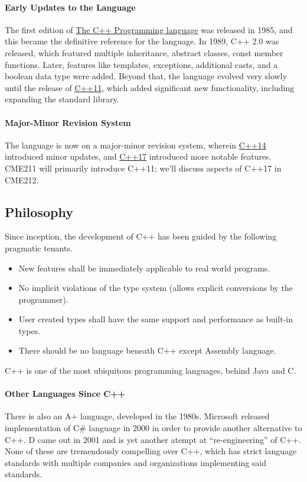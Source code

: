 \documentclass[12pt,letterpaper,twoside]{article}
\begin{document}
  \paragraph{Early Updates to the Language} The first edition of
  \href{https://en.wikipedia.org/wiki/The_C\%2B\%2B_Programming_Language}{The
    C++ Programming language} was released in 1985, and this became
  the definitive reference for the language. In 1989, C++
  2.0 was released, which featured multiple inheritance, abstract
  classes, const member functions. Later, features like templates,
  exceptions, additional casts, and a boolean data type were
  added. Beyond that, the language evolved very slowly until the
  release of
  \href{https://en.wikipedia.org/wiki/C\%2B\%2B11}{C++11},
  which added significant new functionality,
  including expanding the standard library.

  \paragraph{Major-Minor Revision System}
  The language is now on a
  major-minor revision system, wherein
  \href{https://en.wikipedia.org/wiki/C\%2B\%2B14}{C++14}
  introduced minor updates,
  and
  \href{https://en.wikipedia.org/wiki/C\%2B\%2B17}{C++17} introduced
  more notable features.
  CME211 will primarily introduce C++11; we'll
  discuss aspects of C++17 in CME212.

  \subsection{Philosophy} Since inception, the development of C++ has
  been guided by the following pragmatic tenants.

  \begin{itemize}
  \item New features shall be immediately applicable to real world programs.
  \item No implicit violations of the type system ({\footnotesize allows explicit
    conversions by the programmer}).
  \item User created types shall have the same support and performance
    as built-in types.
  \item There should be no language beneath C++ except Assembly language.
  \end{itemize}
  C++ is one of the most
  ubiquitous programming languages, behind Java and C.

  \paragraph{Other Languages Since C++}
  There is also an A+ language, developed in the 1980s.
  Microsoft released implementation of C\# language in 2000 in
  order to provide another alternative to C++.
  D came out in 2001 and is yet another
  atempt at ``re-engineering'' of C++. None of these are tremendously
  compelling over C++, which has strict language standards with
  multiple companies and organizations implementing said standards.
\end{document}
